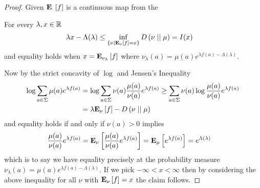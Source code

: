 \begin{proof}
Given $\sexpectation{f}{\cdot}$ is a continuous map from the 

\begin{clm}For every $\lambda, x \in \reals$
\begin{align*}
\lambda x - \Lambda(\lambda) &\leq \inf_{\lbrace \nu \mid \sexpectation{f}{\nu}=x \rbrace} \kldiv{\nu}{\mu} = I(x)
\end{align*}
and equality holds when $x = \sexpectation{f}{\nu_\lambda}$ where  $\nu_\lambda(a) = \mu(a) e^{\lambda f(a) - \Lambda(\lambda)}$. 
\end{clm}
Now by the strict concavity of $\log$ and Jensen's Inequality
\begin{align*}
\log \sum_{a \in \Sigma} \mu(a) e^{\lambda f(a)} 
&=\log \sum_{a \in \Sigma} \nu(a) \frac{\mu(a)}{\nu(a)} e^{\lambda f(a)} 
\geq \sum_{a \in \Sigma} \nu(a) \log \frac{\mu(a)}{\nu(a)} e^{\lambda f(a)} \\
&=\lambda \sexpectation{f}{\nu} - \kldiv{\nu}{\mu}
\end{align*}
and equality holds if and only if $\nu(a) > 0$ implies
\begin{align*}
\frac{\mu(a)}{\nu(a)} e^{\lambda f(a)} &= \sexpectation{\frac{\mu(a)}{\nu(a)} e^{\lambda f(a)}}{\nu}
=\sexpectation{e^{\lambda f(a)}}{\mu} = e^{\Lambda(\lambda)}
\end{align*}
which is to say we have equality precisely at the probability measure $\nu_\lambda(a) = \mu(a) e^{\lambda f(a) - \Lambda(\lambda)}$. 
If we pick $-\infty < x < \infty$ then by considering the above inequality for all $\nu$ with $\sexpectation{f}{\nu}=x$ the
claim follows.


\end{proof}
